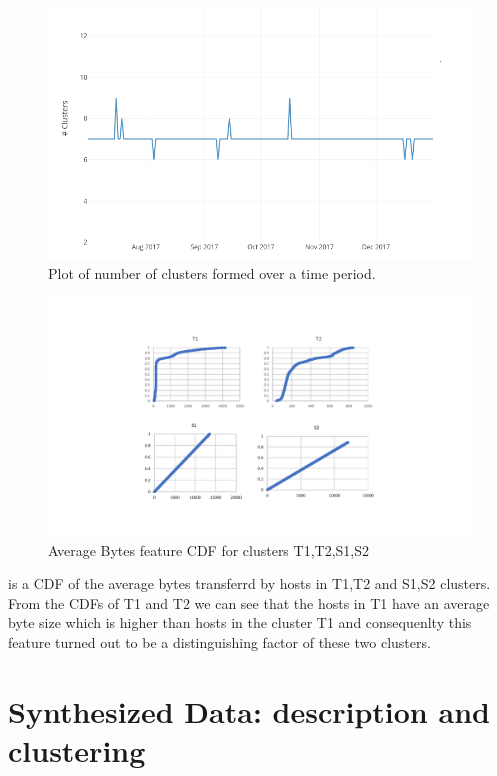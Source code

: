 \begin{figure}[t]
	\centerline{\includegraphics{constant.png}}
	\caption{ Plot of number of clusters formed over a time period.}%
\end{figure}


\begin{figure}[t]
	\centerline{\includegraphics[trim=2cm 2cm 2cm 2cm, scale = 0.7]{bytes_cdf.pdf}}
	\caption{ Average Bytes feature CDF for clusters T1,T2,S1,S2}%
\end{figure}

 is a CDF of the average bytes transferrd by hosts in T1,T2 and S1,S2 clusters. From the CDFs of T1 and T2 we can see that the hosts in T1 have an average byte size which is higher than hosts in the cluster T1 and consequenlty this feature turned out to be a distinguishing factor of these two clusters. 

\section{Synthesized Data: description and clustering}

